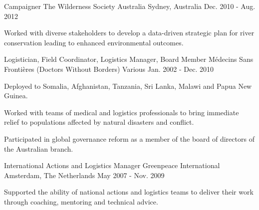 \begin{cventries}
  \cventry
    {Campaigner} %
    {The Wilderness Society Australia} %
    {Sydney, Australia} %
    {Dec. 2010 - Aug. 2012} %
    {
      \begin{cvitems} %
        \item {Worked with diverse stakeholders to develop a data-driven strategic plan for river conservation leading to enhanced environmental outcomes.}
      \end{cvitems}
    }


  \cventry
    {Logistician, Field Coordinator, Logistics Manager, Board Member} %
    {Médecins Sans Frontières (Doctors Without Borders)} %
    {Various} %
    {Jan. 2002 - Dec. 2010} %
    {
      \begin{cvitems} %
        \item {Deployed to Somalia, Afghanistan, Tanzania, Sri Lanka, Malawi and Papua New Guinea.}
        \item {Worked with teams of medical and logistics professionals to bring immediate relief to populations affected by natural disasters and conflict.}
        \item {Participated in global governance reform as a member of the board of directors of the Australian branch.}
       \end{cvitems}
    }
    
  \cventry
    {International Actions and Logistics Manager} %
    {Greenpeace International} %
    {Amsterdam, The Netherlands} %
    {May 2007 - Nov. 2009} %
    {
      \begin{cvitems} %
        \item {Supported the ability of national actions and logistics teams to deliver their work through coaching, mentoring and technical advice.}
      \end{cvitems}
    }


\end{cventries}
